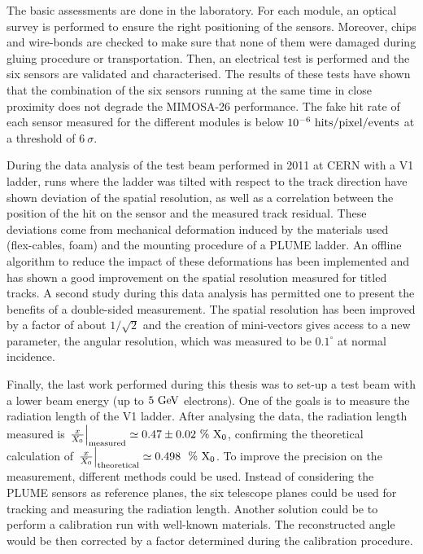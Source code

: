 The basic assessments are done in the laboratory.
For each module, an optical survey is performed to ensure the right positioning of the sensors.
Moreover, chips and wire-bonds are checked to make sure that none of them were damaged during gluing procedure or transportation.
Then, an electrical test is performed and the six sensors are validated and characterised.
The results of these tests have shown that the combination of the six sensors running at the same time in close proximity does not degrade the \gls{MIMOSA}-26 performance.
The fake hit rate of each sensor measured for the different modules is below $10^{-6}~\rm{hits/pixel/events}$ at a threshold of $6~\sigma$.

During the data analysis of the test beam performed in 2011 at \gls{CERN} with a V1 ladder, runs where the ladder was tilted with respect to the track direction have shown deviation of the spatial resolution, as well as a correlation between the position of the hit on the sensor and the measured track residual.
These deviations come from mechanical deformation induced by the materials used (flex-cables, foam) and the mounting procedure of a \gls{PLUME} ladder.
An offline algorithm to reduce the impact of these deformations has been implemented and has shown a good improvement on the spatial resolution measured for titled tracks.
A second study during this data analysis has permitted one to present the benefits of a double-sided measurement. 
The spatial resolution has been improved by a factor of about $1/\sqrt{2}$ and the creation of mini-vectors gives access to a new parameter, the angular resolution, which was measured to be $0.1^{\circ}$ at normal incidence.

Finally, the last work performed during this thesis was to set-up a test beam with a lower beam energy (up to $5~\rm{GeV}$ electrons).
One of the goals is to measure the radiation length of the V1 ladder.
After analysing the data, the radiation length measured is $\left. \frac{x}{X_0} \right|_{\rm{measured}} \simeq 0.47 \pm 0.02~\%~\rm{X_0}$, confirming the theoretical calculation of $\left. \frac{x}{X_0}\right|_{\rm{theoretical}} \simeq 0.498~~\%~\rm{X_0}$.
To improve the precision on the measurement, different methods could be used.
Instead of considering the \gls{PLUME} sensors as reference planes, the six telescope planes could be used for tracking and measuring the radiation length.
Another solution could be to perform a calibration run with well-known materials. 
The reconstructed angle would be then corrected by a factor determined during the calibration procedure.


